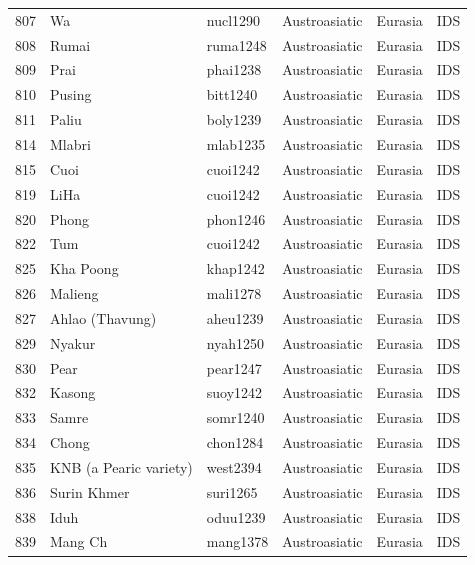 \begin{table}[ht]
\begin{tabular}{rlllll}
  807 & Wa & nucl1290 & Austroasiatic & Eurasia & IDS \\ 
  808 & Rumai & ruma1248 & Austroasiatic & Eurasia & IDS \\ 
  809 & Prai & phai1238 & Austroasiatic & Eurasia & IDS \\ 
  810 & Pusing & bitt1240 & Austroasiatic & Eurasia & IDS \\ 
  811 & Paliu & boly1239 & Austroasiatic & Eurasia & IDS \\ 
  814 & Mlabri & mlab1235 & Austroasiatic & Eurasia & IDS \\ 
  815 & Cuoi & cuoi1242 & Austroasiatic & Eurasia & IDS \\ 
  819 & LiHa & cuoi1242 & Austroasiatic & Eurasia & IDS \\ 
  820 & Phong & phon1246 & Austroasiatic & Eurasia & IDS \\ 
  822 & Tum & cuoi1242 & Austroasiatic & Eurasia & IDS \\ 
  825 & Kha Poong & khap1242 & Austroasiatic & Eurasia & IDS \\ 
  826 & Malieng & mali1278 & Austroasiatic & Eurasia & IDS \\ 
  827 & Ahlao (Thavung) & aheu1239 & Austroasiatic & Eurasia & IDS \\ 
  829 & Nyakur & nyah1250 & Austroasiatic & Eurasia & IDS \\ 
  830 & Pear & pear1247 & Austroasiatic & Eurasia & IDS \\ 
  832 & Kasong & suoy1242 & Austroasiatic & Eurasia & IDS \\ 
  833 & Samre & somr1240 & Austroasiatic & Eurasia & IDS \\ 
  834 & Chong & chon1284 & Austroasiatic & Eurasia & IDS \\ 
  835 & KNB (a Pearic variety) & west2394 & Austroasiatic & Eurasia & IDS \\ 
  836 & Surin Khmer & suri1265 & Austroasiatic & Eurasia & IDS \\ 
  838 & Iduh & oduu1239 & Austroasiatic & Eurasia & IDS \\ 
  839 & Mang Ch & mang1378 & Austroasiatic & Eurasia & IDS \\ 
   \hline
\end{tabular}
\end{table}
